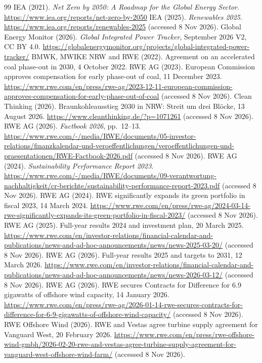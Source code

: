 \documentclass[11pt,a4paper]{article}
\begin{document}
\begin{thebibliography}{99}
 IEA (2021). \emph{Net Zero by 2050: A Roadmap for the Global Energy Sector}. \url{https://www.iea.org/reports/net-zero-by-2050}
 IEA (2025). \emph{Renewables 2025}. \url{https://www.iea.org/reports/renewables-2025} (accessed 8 Nov 2026).
 Global Energy Monitor (2026). \emph{Global Integrated Power Tracker}, September 2026 V2, CC BY 4.0. \url{https://globalenergymonitor.org/projects/global-integrated-power-tracker/}
 BMWK, MWIKE NRW and RWE (2022). Agreement on an accelerated coal phase-out in 2030, 4 October 2022.
 RWE AG (2023). European Commission approves compensation for early phase-out of coal, 11 December 2023. \url{https://www.rwe.com/en/press/rwe-ag/2023-12-11-european-commission-approves-compensation-for-early-phase-out-of-coal} (accessed 8 Nov 2026).
 Clean Thinking (2026). Braunkohleausstieg 2030 in NRW: Streit um drei Blöcke, 13 August 2026. \url{https://www.cleanthinking.de/?p=1071261} (accessed 8 Nov 2026).
 RWE AG (2026). \emph{Factbook 2026}, pp.\ 12--13. \url{https://www.rwe.com/-/media/RWE/documents/05-investor-relations/finanzkalendar-und-veroeffentlichungen/veroeffentlichungen-und-praesentationen/RWE-Factbook-2026.pdf} (accessed 8 Nov 2026).
 RWE AG (2024). \emph{Sustainability Performance Report 2023}. \url{https://www.rwe.com/-/media/RWE/documents/09-verantwortung-nachhaltigkeit/cr-berichte/sustainability-performance-report-2023.pdf} (accessed 8 Nov 2026).
 RWE AG (2024). RWE significantly expands its green portfolio in fiscal 2023, 14 March 2024. \url{https://www.rwe.com/en/press/rwe-ag/2024-03-14-rwe-significantly-expands-its-green-portfolio-in-fiscal-2023/} (accessed 8 Nov 2026).
 RWE AG (2025). Full-year results 2024 and investment plan, 20 March 2025. \url{https://www.rwe.com/en/investor-relations/financial-calendar-and-publications/news-and-ad-hoc-announcements/news/news-2025-03-20/} (accessed 8 Nov 2026).
 RWE AG (2026). Full-year results 2025 and targets to 2031, 12 March 2026. \url{https://www.rwe.com/en/investor-relations/financial-calendar-and-publications/news-and-ad-hoc-announcements/news/news-2026-03-12/} (accessed 8 Nov 2026).
 RWE AG (2026). RWE secures Contracts for Difference for 6.9 gigawatts of offshore wind capacity, 14 January 2026. \url{https://www.rwe.com/en/press/rwe-ag/2026-01-14-rwe-secures-contracts-for-difference-for-6-9-gigawatts-of-offshore-wind-capacity/} (accessed 8 Nov 2026).
 RWE Offshore Wind (2026). RWE and Vestas agree turbine supply agreement for Vanguard West, 20 February 2026. \url{https://www.rwe.com/en/press/rwe-offshore-wind-gmbh/2026-02-20-rwe-and-vestas-agree-turbine-supply-agreement-for-vanguard-west-offshore-wind-farm/} (accessed 8 Nov 2026).

\end{thebibliography}
\end{document}
